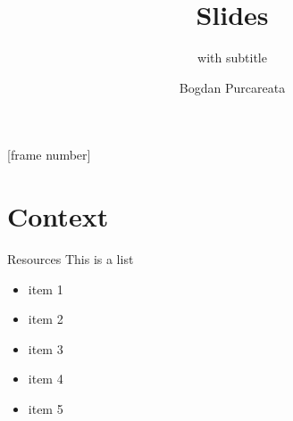 \documentclass{beamer}
\title{Slides}
\subtitle{with subtitle}
\author{Bogdan Purcareata}
\begin{document}
[frame number]

\frame{\titlepage}

\frame{\tableofcontents}

\section{Context}

\begin{frame}{Resources}
This is a list
\begin{itemize}
\item item 1
\item item 2
\item item 3
\item item 4
\item item 5
\end{itemize}

\end{frame}
\end{document}
